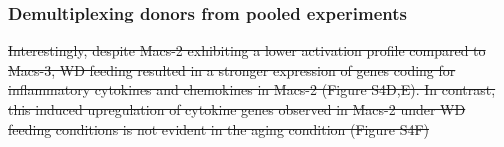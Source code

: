 \subsubsection{Demultiplexing donors from pooled experiments} 

\st{Interestingly, despite Macs-2 exhibiting a lower activation profile compared to Macs-3, WD feeding resulted in a stronger expression of genes coding for inflammatory cytokines and chemokines in Macs-2 (Figure S4D,E). In contrast, this induced upregulation of cytokine genes observed in Macs-2 under WD feeding conditions is not evident in the aging condition (Figure S4F)}



